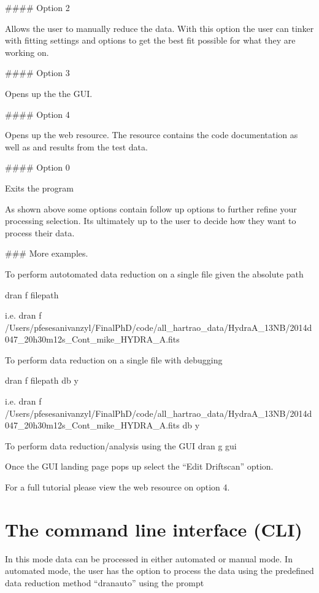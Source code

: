 \documentclass[letterpaper,10pt,english]{sphinxmanual}
\begin{document}
\sphinxAtStartPar
\#\#\#\# Option 2

\sphinxAtStartPar
Allows the user to manually reduce the data. With this option the user can tinker with fitting settings and options to get the best fit possible for what they are working on.

\sphinxAtStartPar
\#\#\#\# Option 3

\sphinxAtStartPar
Opens up the the GUI.

\sphinxAtStartPar
\#\#\#\# Option 4

\sphinxAtStartPar
Opens up the web resource. The resource contains the code documentation as well as  and results from the test data.

\sphinxAtStartPar
\#\#\#\# Option 0

\sphinxAtStartPar
Exits the program

\sphinxAtStartPar
As shown above some options contain follow up options to further refine your processing selection. Its ultimately up to the user to decide how they want to process their data.

\sphinxAtStartPar
\#\#\# More examples.

\sphinxAtStartPar
To perform autotomated data reduction on a single file given the absolute path

\sphinxAtStartPar
dran \sphinxhyphen{}f filepath

\sphinxAtStartPar
i.e.
dran \sphinxhyphen{}f /Users/pfesesanivanzyl/Final\sphinxhyphen{}PhD/code/all\_hartrao\_data/HydraA\_13NB/2014d047\_20h30m12s\_Cont\_mike\_HYDRA\_A.fits

\sphinxAtStartPar
To perform data reduction on a single file with debugging

\sphinxAtStartPar
dran \sphinxhyphen{}f filepath \sphinxhyphen{}db y

\sphinxAtStartPar
i.e.
dran \sphinxhyphen{}f /Users/pfesesanivanzyl/Final\sphinxhyphen{}PhD/code/all\_hartrao\_data/HydraA\_13NB/2014d047\_20h30m12s\_Cont\_mike\_HYDRA\_A.fits \sphinxhyphen{}db y

\sphinxAtStartPar
To perform data reduction/analysis using the GUI
dran \sphinxhyphen{}g gui

\sphinxAtStartPar
Once the GUI landing page pops up select the “Edit Driftscan” option.

\sphinxAtStartPar
For a full tutorial please view the web resource on option 4.

\sphinxstepscope


\section{The command line interface (CLI)}
\label{\detokenize{extras/cli:the-command-line-interface-cli}}\label{\detokenize{extras/cli::doc}}
\sphinxAtStartPar
In this mode data can be processed in either automated or manual
mode. In automated mode, the user has the option to process the data
using the predefined data reduction method “dran\sphinxhyphen{}auto” using the prompt
\end{document}
